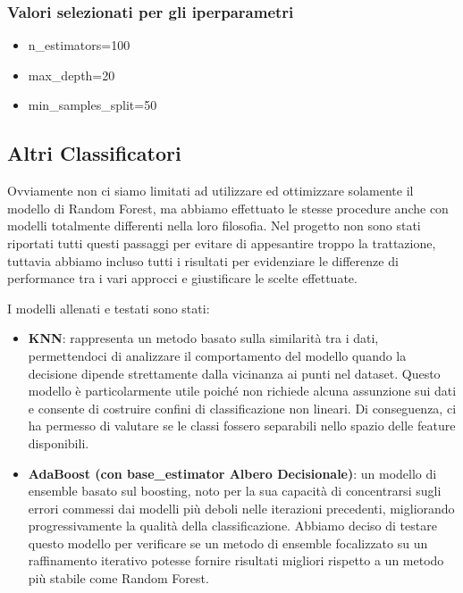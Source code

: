 \documentclass{article}
\begin{document}
\begin{multicols}{2}
\subsubsection*{Valori selezionati per gli iperparametri}

\begin{itemize}[leftmargin=*]
    \item n\_estimators=100
    \item max\_depth=20
    \item min\_samples\_split=50
\end{itemize}

\subsection{Altri Classificatori}

Ovviamente non ci siamo limitati ad utilizzare ed ottimizzare solamente il modello di Random Forest, ma abbiamo effettuato le stesse procedure anche con modelli totalmente differenti nella loro filosofia. Nel progetto non sono stati riportati tutti questi passaggi per evitare di appesantire troppo la trattazione, tuttavia abbiamo incluso tutti i risultati per evidenziare le differenze di performance tra i vari approcci e giustificare le scelte effettuate.

I modelli allenati e testati sono stati:

\begin{itemize}[leftmargin=*]
    \item \textbf{KNN}: rappresenta un metodo basato sulla similarità tra i dati, permettendoci di analizzare il comportamento del modello quando la decisione dipende strettamente dalla vicinanza ai punti nel dataset. Questo modello è particolarmente utile poiché non richiede alcuna assunzione sui dati e consente di costruire confini di classificazione non lineari. Di conseguenza, ci ha permesso di valutare se le classi fossero separabili nello spazio delle feature disponibili.
    
    \item \textbf{AdaBoost (con base\_estimator Albero Decisionale)}: un modello di ensemble basato sul boosting, noto per la sua capacità di concentrarsi sugli errori commessi dai modelli più deboli nelle iterazioni precedenti, migliorando progressivamente la qualità della classificazione. Abbiamo deciso di testare questo modello per verificare se un metodo di ensemble focalizzato su un raffinamento iterativo potesse fornire risultati migliori rispetto a un metodo più stabile come Random Forest.
    

\end{itemize}
\end{multicols}
\end{document}
